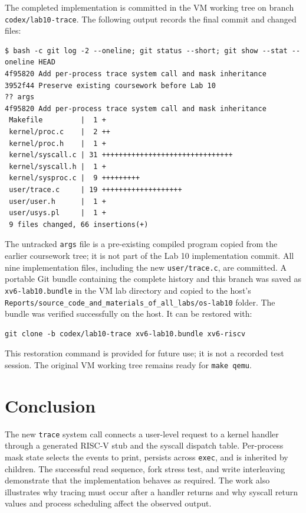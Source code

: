 \documentclass[12pt,a4paper]{article}
\begin{document}
The completed implementation is committed in the VM working tree on branch
\texttt{codex/lab10-trace}. The following output records the final commit and
changed files:

\begin{lstlisting}[caption={Recorded Git history, working-tree status, and implementation summary}]
$ bash -c git log -2 --oneline; git status --short; git show --stat --oneline HEAD
4f95820 Add per-process trace system call and mask inheritance
3952f44 Preserve existing coursework before Lab 10
?? args
4f95820 Add per-process trace system call and mask inheritance
 Makefile         |  1 +
 kernel/proc.c    |  2 ++
 kernel/proc.h    |  1 +
 kernel/syscall.c | 31 +++++++++++++++++++++++++++++++
 kernel/syscall.h |  1 +
 kernel/sysproc.c |  9 +++++++++
 user/trace.c     | 19 +++++++++++++++++++
 user/user.h      |  1 +
 user/usys.pl     |  1 +
 9 files changed, 66 insertions(+)
\end{lstlisting}

The untracked \texttt{args} file is a pre-existing compiled program copied from
the earlier coursework tree; it is not part of the Lab 10 implementation commit.
All nine implementation files, including the new \texttt{user/trace.c}, are
committed. A portable Git bundle containing the complete history and this branch
was saved as \texttt{xv6-lab10.bundle} in the VM lab directory and copied to the
host's \texttt{Reports/source\_code\_and\_materials\_of\_all\_labs/os-lab10}
folder. The bundle was verified successfully on the host. It can be restored with:

\begin{lstlisting}[caption={Restoring the committed xv6 source from the portable Git bundle}]
git clone -b codex/lab10-trace xv6-lab10.bundle xv6-riscv
\end{lstlisting}

This restoration command is provided for future use; it is not a recorded test
session. The original VM working tree remains ready for \texttt{make qemu}.

\section{Conclusion}
The new \texttt{trace} system call connects a user-level request to a kernel
handler through a generated RISC-V stub and the syscall dispatch table. Per-process
mask state selects the events to print, persists across \texttt{exec}, and is
inherited by children. The successful read sequence, fork stress test, and write
interleaving demonstrate that the implementation behaves as required. The work
also illustrates why tracing must occur after a handler returns and why syscall
return values and process scheduling affect the observed output.
\end{document}
